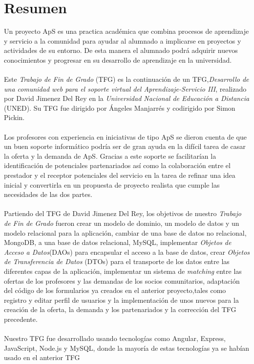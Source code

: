 \documentclass[11pt]{book}
\begin{document}



\tableofcontents
\newpage
\listoffigures
\chapter*{Resumen} 
Un proyecto ApS es una practica académica que combina procesos de aprendizaje y servicio a la comunidad para ayudar al alumnado a implicarse en proyectos y actividades de su entorno. De esta manera el alumnado podrá adquirir nuevos conocimientos y progresar en su desarrollo de aprendizaje en la universidad.\\\\
Este \textit{Trabajo de Fin de Grado} (TFG) es la continuación de un TFG,\textit{Desarrollo de una comunidad web para el soporte virtual del Aprendizaje-Servicio III}, realizado por David Jimenez Del Rey en la \emph{Universidad Nacional de Educación a Distancia} (UNED). Su TFG fue dirigido por Ángeles Manjarrés y codirigido por Simon Pickin. \\\\
Los profesores con experiencia en iniciativas de tipo ApS se dieron cuenta de que un buen soporte informático podría ser de gran ayuda en la difícil tarea de casar la oferta y la demanda de ApS. Gracias a este soporte se facilitarían la identificación de potenciales partenariados así como la colaboración entre el prestador y el receptor potenciales del servicio en la tarea de refinar una idea inicial y convertirla en un propuesta de proyecto realista que cumple las necesidades de las dos partes.\\\\ 
Partiendo del TFG de David Jimenez Del Rey, los objetivos de nuestro \textit{Trabajo de Fin de Grado} fueron crear un modelo de dominio, un modelo de datos y un modelo relacional para la aplicación, cambiar de una base de datos no relacional, MongoDB, a una base de datos relacional, MySQL, implementar \emph{Objetos de Acceso a Datos}(DAOs) para encapsular el acceso a la base de datos, crear \emph{Objetos de Transferencia de Datos} (DTOs) para el transporte de los datos entre las diferentes capas de la aplicación, implementar un sistema de \textit{matching} entre las ofertas de los profesores y las demandas de los socios comunitarios, adaptación del código de los formularios ya creados en el anterior proyecto,tales como registro  y editar perfil de usuarios y la implementación de unos nuevos para la creación  de la oferta, la demanda y los partenariados y la corrección del TFG precedente.\\\\
Nuestro TFG fue desarrollado usando tecnologías como Angular, Express, JavaScript, Node.js y MySQL, donde la mayoría de estas tecnologías ya se habían usado en el anterior TFG\\\\
\end{document}
